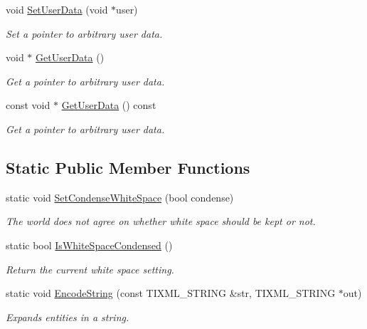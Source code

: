 \begin{DoxyCompactItemize}
void \hyperlink{classTiXmlBase_ac6b3e0f790930d4970ec30764e937b5d}{SetUserData} (void $\ast$user)
\begin{DoxyCompactList}\small\item\em Set a pointer to arbitrary user data. \item\end{DoxyCompactList}\item 
void $\ast$ \hyperlink{classTiXmlBase_a6559a530ca6763fc301a14d77ed28c17}{GetUserData} ()
\begin{DoxyCompactList}\small\item\em Get a pointer to arbitrary user data. \item\end{DoxyCompactList}\item 
const void $\ast$ \hyperlink{classTiXmlBase_ad0120210e4680ef2088601753ce0ede4}{GetUserData} () const 
\begin{DoxyCompactList}\small\item\em Get a pointer to arbitrary user data. \item\end{DoxyCompactList}\end{DoxyCompactItemize}
\subsection*{Static Public Member Functions}
\begin{DoxyCompactItemize}
\item 
static void \hyperlink{classTiXmlBase_a0f799ec645bfb8d8a969e83478f379c1}{SetCondenseWhiteSpace} (bool condense)
\begin{DoxyCompactList}\small\item\em The world does not agree on whether white space should be kept or not. \item\end{DoxyCompactList}\item 
static bool \hyperlink{classTiXmlBase_ad4b1472531c647a25b1840a87ae42438}{IsWhiteSpaceCondensed} ()
\begin{DoxyCompactList}\small\item\em Return the current white space setting. \item\end{DoxyCompactList}\item 
static void \hyperlink{classTiXmlBase_a32ed202562b58de64c7d799ca3c9db98}{EncodeString} (const TIXML\_\-STRING \&str, TIXML\_\-STRING $\ast$out)
\begin{DoxyCompactList}\small\item\em Expands entities in a string. \item\end{DoxyCompactList}\end{DoxyCompactItemize}
